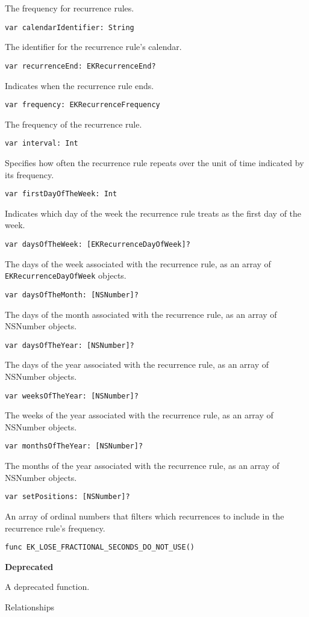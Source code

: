 \documentclass{article}
\begin{document}
The frequency for recurrence rules.

\texttt{var calendarIdentifier: String}

The identifier for the recurrence rule's calendar.

\texttt{var recurrenceEnd: EKRecurrenceEnd?}

Indicates when the recurrence rule ends.

\texttt{var frequency: EKRecurrenceFrequency}

The frequency of the recurrence rule.

\texttt{var interval: Int}

Specifies how often the recurrence rule repeats over the unit of time indicated by its frequency.

\texttt{var firstDayOfTheWeek: Int}

Indicates which day of the week the recurrence rule treats as the first day of the week.

\texttt{var daysOfTheWeek: [EKRecurrenceDayOfWeek]?}

The days of the week associated with the recurrence rule, as an array of \texttt{EKRecurrenceDayOfWeek} objects.

\texttt{var daysOfTheMonth: [NSNumber]?}

The days of the month associated with the recurrence rule, as an array of NSNumber objects.

\texttt{var daysOfTheYear: [NSNumber]?}

The days of the year associated with the recurrence rule, as an array of NSNumber objects.

\texttt{var weeksOfTheYear: [NSNumber]?}

The weeks of the year associated with the recurrence rule, as an array of NSNumber objects.

\texttt{var monthsOfTheYear: [NSNumber]?}

The months of the year associated with the recurrence rule, as an array of NSNumber objects.

\texttt{var setPositions: [NSNumber]?}

An array of ordinal numbers that filters which recurrences to include in the recurrence rule's frequency.

\texttt{func EK\_LOSE\_FRACTIONAL\_SECONDS\_DO\_NOT\_USE()}

\textbf{Deprecated}

A deprecated function.

Relationships
\end{document}
